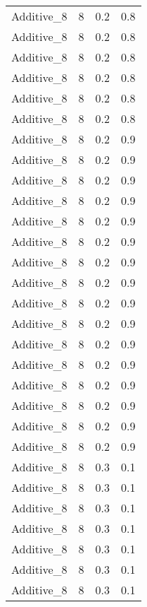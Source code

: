 \documentclass{article}
\begin{document}
\begin{longtable}[H]{lrrr}
 Additive\_8 &       8 &   0.2 &            0.8 \\
 Additive\_8 &       8 &   0.2 &            0.8 \\
 Additive\_8 &       8 &   0.2 &            0.8 \\
 Additive\_8 &       8 &   0.2 &            0.8 \\
 Additive\_8 &       8 &   0.2 &            0.8 \\
 Additive\_8 &       8 &   0.2 &            0.8 \\
 Additive\_8 &       8 &   0.2 &            0.9 \\
 Additive\_8 &       8 &   0.2 &            0.9 \\
 Additive\_8 &       8 &   0.2 &            0.9 \\
 Additive\_8 &       8 &   0.2 &            0.9 \\
 Additive\_8 &       8 &   0.2 &            0.9 \\
 Additive\_8 &       8 &   0.2 &            0.9 \\
 Additive\_8 &       8 &   0.2 &            0.9 \\
 Additive\_8 &       8 &   0.2 &            0.9 \\
 Additive\_8 &       8 &   0.2 &            0.9 \\
 Additive\_8 &       8 &   0.2 &            0.9 \\
 Additive\_8 &       8 &   0.2 &            0.9 \\
 Additive\_8 &       8 &   0.2 &            0.9 \\
 Additive\_8 &       8 &   0.2 &            0.9 \\
 Additive\_8 &       8 &   0.2 &            0.9 \\
 Additive\_8 &       8 &   0.2 &            0.9 \\
 Additive\_8 &       8 &   0.2 &            0.9 \\
 Additive\_8 &       8 &   0.3 &            0.1 \\
 Additive\_8 &       8 &   0.3 &            0.1 \\
 Additive\_8 &       8 &   0.3 &            0.1 \\
 Additive\_8 &       8 &   0.3 &            0.1 \\
 Additive\_8 &       8 &   0.3 &            0.1 \\
 Additive\_8 &       8 &   0.3 &            0.1 \\
 Additive\_8 &       8 &   0.3 &            0.1 \\

\end{longtable}
\end{document}
